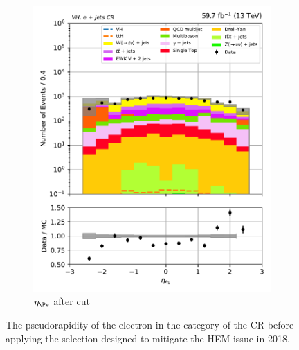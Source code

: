 \begin{figure}[htbp]
\begin{subfigure}[b]{0.34\textwidth}
        \includegraphics[width=\textwidth]{figures/hem_issue/region_3/leadLepton_eta/leadLepton_eta_VH_after.pdf}
        \caption{$\eta_{\Pe}$ after cut}
    \end{subfigure}
    \caption[The pseudorapidity of the electron in the \VH category of the \singleEleCr \gls{CR} before applying the selection designed to mitigate the HEM issue in 2018]{The pseudorapidity of the electron in the \VH category of the \singleEleCr \gls{CR} before applying the selection designed to mitigate the HEM issue in 2018.}
    \label{fig:htoinv_hem_issue_lepton_eta}
\end{figure}

